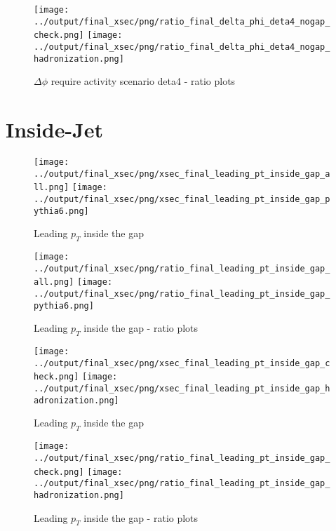 \documentclass[11pt]{article}
\begin{document}
\begin{figure}[ht]
\centering
\texttt{[image: ../output/final\_xsec/png/ratio\_final\_delta\_phi\_deta4\_nogap\_check.png]}
\texttt{[image: ../output/final\_xsec/png/ratio\_final\_delta\_phi\_deta4\_nogap\_hadronization.png]}
\caption{$\Delta\phi$ require activity scenario deta4 - ratio plots}
\label{fig:delta_phi_deta4_nogapb_ratio}
\end{figure}

\clearpage
\section{Inside-Jet}

\begin{figure}[ht]
\centering
\texttt{[image: ../output/final\_xsec/png/xsec\_final\_leading\_pt\_inside\_gap\_all.png]}
\texttt{[image: ../output/final\_xsec/png/xsec\_final\_leading\_pt\_inside\_gap\_pythia6.png]}
\caption{Leading $p_{T}$ inside the gap}
\label{fig:leading_pt_inside_gap}
\end{figure}

\begin{figure}[ht]
\centering
\texttt{[image: ../output/final\_xsec/png/ratio\_final\_leading\_pt\_inside\_gap\_all.png]}
\texttt{[image: ../output/final\_xsec/png/ratio\_final\_leading\_pt\_inside\_gap\_pythia6.png]}
\caption{Leading $p_{T}$ inside the gap - ratio plots}
\label{fig:leading_pt_inside_gap_ratio}
\end{figure}

\begin{figure}[ht]
\centering
\texttt{[image: ../output/final\_xsec/png/xsec\_final\_leading\_pt\_inside\_gap\_check.png]}
\texttt{[image: ../output/final\_xsec/png/xsec\_final\_leading\_pt\_inside\_gap\_hadronization.png]}
\caption{Leading $p_{T}$ inside the gap}
\label{fig:leading_pt_inside_gapb}
\end{figure}

\begin{figure}[ht]
\centering
\texttt{[image: ../output/final\_xsec/png/ratio\_final\_leading\_pt\_inside\_gap\_check.png]}
\texttt{[image: ../output/final\_xsec/png/ratio\_final\_leading\_pt\_inside\_gap\_hadronization.png]}
\caption{Leading $p_{T}$ inside the gap - ratio plots}
\label{fig:leading_pt_inside_gapb_ratio}
\end{figure}
\end{document}
